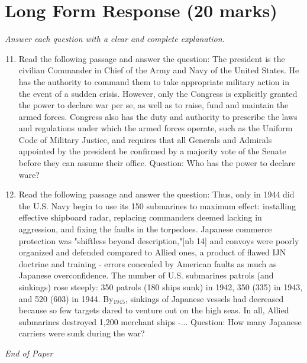 \documentclass[12pt]{article}
\begin{document}
\section*{Long Form Response (20 marks)}
\textit{Answer each question with a clear and complete explanation.}
\begin{enumerate}[label=\arabic*.]
\setcounter{enumi}{10}
\item Read the following passage and answer the question: The president is the civilian Commander in Chief of the Army and Navy of the United States. He has the authority to command them to take appropriate military action in the event of a sudden crisis. However, only the Congress is explicitly granted the power to declare war per se, as well as to raise, fund and maintain the armed forces. Congress also has the duty and authority to prescribe the laws and regulations under which the armed forces operate, such as the Uniform Code of Military Justice, and requires that all Generals and Admirals appointed by the president be confirmed by a majority vote of the Senate before they can assume their office. Question: Who has the power to declare ware?
\item Read the following passage and answer the question: Thus, only in 1944 did the U.S. Navy begin to use its 150 submarines to maximum effect: installing effective shipboard radar, replacing commanders deemed lacking in aggression, and fixing the faults in the torpedoes. Japanese commerce protection was "shiftless beyond description,"[nb 14] and convoys were poorly organized and defended compared to Allied ones, a product of flawed IJN doctrine and training - errors concealed by American faults as much as Japanese overconfidence. The number of U.S. submarines patrols (and sinkings) rose steeply: 350 patrols (180 ships sunk) in 1942, 350 (335) in 1943, and 520 (603) in 1944. By$_{1945}$, sinkings of Japanese vessels had decreased because so few targets dared to venture out on the high seas. In all, Allied submarines destroyed 1,200 merchant ships -... Question: How many Japanese carriers were sunk during the war?
\end{enumerate}

\vfill
\noindent\textit{End of Paper}
\end{document}
